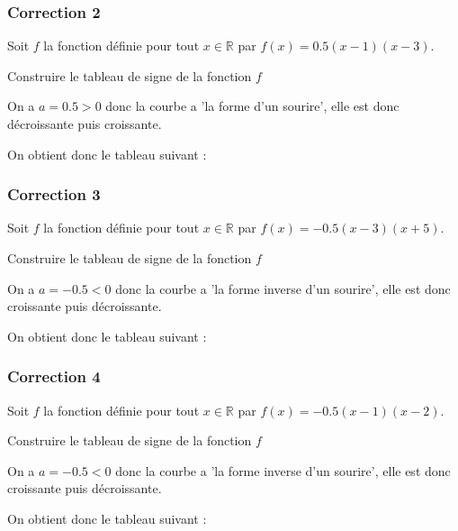 \documentclass[15pt, mathserif]{beamer}
\newcommand{\R}{\mathbb{R}}			%
\begin{document}
\begin{frame}
\vspace{-10mm}
	\frametitle{Correction 2}
 \vspace*{1cm} Soit $f$ la fonction définie pour tout $x \in \R$ par $f(x)=0.5(x-1)(x-3)$. 
 
  Construire le tableau de signe de la fonction $f$ 
 
 On a $a=0.5>0$ donc la courbe a 'la forme d'un sourire', elle est donc décroissante puis croissante. 
 
 On obtient donc le tableau suivant : 
 \begin{center} 
 \end{center} 
\end{frame}


\begin{frame}
\vspace{-10mm}
	\frametitle{Correction 3}
 \vspace*{1cm} Soit $f$ la fonction définie pour tout $x \in \R$ par $f(x)=-0.5(x-3)(x+5)$. 
 
  Construire le tableau de signe de la fonction $f$ 
 
 On a $a=-0.5<0$ donc la courbe a 'la forme inverse d'un sourire', elle est donc croissante puis décroissante.
 
 On obtient donc le tableau suivant : 
 \begin{center} 
 \end{center} 
\end{frame}


\begin{frame}
\vspace{-10mm}
	\frametitle{Correction 4}
 \vspace*{1cm} Soit $f$ la fonction définie pour tout $x \in \R$ par $f(x)=-0.5(x-1)(x-2)$. 
 
  Construire le tableau de signe de la fonction $f$ 
 
 On a $a=-0.5<0$ donc la courbe a 'la forme inverse d'un sourire', elle est donc croissante puis décroissante. 
 
 On obtient donc le tableau suivant : 
 \begin{center} 
 \end{center} 
\end{frame}
\end{document}
